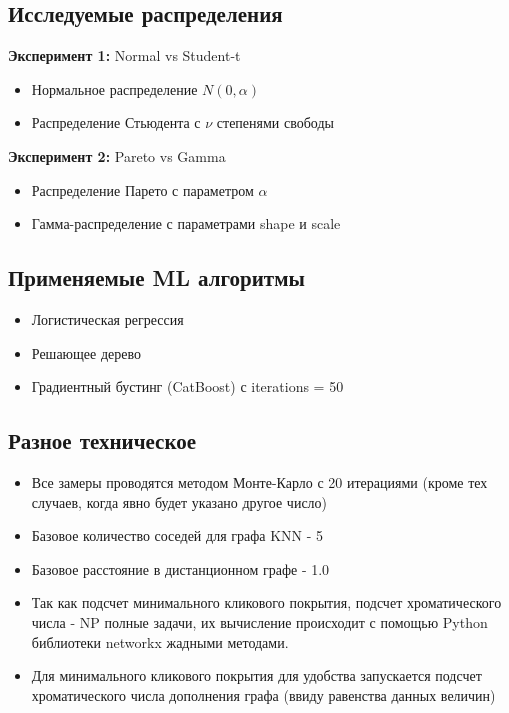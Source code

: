 \documentclass[a4paper,12pt]{report}
\begin{document}
\subsection{Исследуемые распределения}
\textbf{Эксперимент 1:} Normal vs Student-t
\begin{itemize}
    \item Нормальное распределение $N(0, \alpha)$
    \item Распределение Стьюдента с $\nu$ степенями свободы
\end{itemize}

\textbf{Эксперимент 2:} Pareto vs Gamma
\begin{itemize}
    \item Распределение Парето с параметром $\alpha$
    \item Гамма-распределение с параметрами shape и scale
\end{itemize}

\subsection{Применяемые ML алгоритмы}
\begin{itemize}
    \item Логистическая регрессия
    \item Решающее дерево
    \item Градиентный бустинг (CatBoost) с iterations = 50
\end{itemize}

\subsection{Разное техническое}
\begin{itemize}
    \item Все замеры проводятся методом Монте-Карло с 20 итерациями (кроме тех случаев, когда явно будет указано другое число) 
    \item Базовое количество соседей для графа KNN - 5
    \item Базовое расстояние в дистанционном графе - 1.0
    \item Так как подсчет минимального кликового покрытия, подсчет хроматического числа - NP полные задачи, их вычисление происходит с помощью Python библиотеки networkx жадными методами. 
    \item Для минимального кликового покрытия для удобства запускается подсчет хроматического числа дополнения графа (ввиду равенства данных величин)

\end{itemize}
\end{document}
